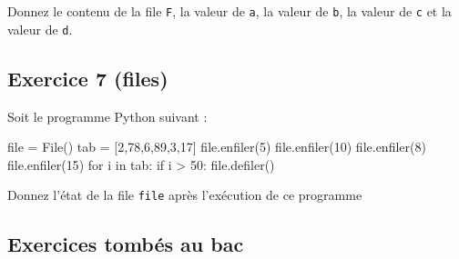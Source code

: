 \documentclass[
  a4paper,
  DIV=11,
  numbers=noendperiod]{scrartcl}
\newenvironment{Shaded}{\begin{snugshade}}{\end{snugshade}}
\newcommand{\BuiltInTok}[1]{\textcolor[rgb]{0.00,0.23,0.31}{#1}}
\newcommand{\ControlFlowTok}[1]{\textcolor[rgb]{0.00,0.23,0.31}{#1}}
\newcommand{\DecValTok}[1]{\textcolor[rgb]{0.68,0.00,0.00}{#1}}
\newcommand{\KeywordTok}[1]{\textcolor[rgb]{0.00,0.23,0.31}{#1}}
\newcommand{\NormalTok}[1]{\textcolor[rgb]{0.00,0.23,0.31}{#1}}
\newcommand{\OperatorTok}[1]{\textcolor[rgb]{0.37,0.37,0.37}{#1}}
\begin{document}
Donnez le contenu de la file \texttt{F}, la valeur de \texttt{a}, la
valeur de \texttt{b}, la valeur de \texttt{c} et la valeur de
\texttt{d}.

\hypertarget{fa-solid-pencil-alt-exercice-7-files}{%
\subsection{\texorpdfstring{ Exercice 7
(files)}{ Exercice 7 (files)}}\label{fa-solid-pencil-alt-exercice-7-files}}

Soit le programme Python suivant :

\begin{Shaded}
\begin{Highlighting}[]
\BuiltInTok{file} \OperatorTok{=}\NormalTok{ File()}
\NormalTok{tab }\OperatorTok{=}\NormalTok{ [}\DecValTok{2}\NormalTok{,}\DecValTok{78}\NormalTok{,}\DecValTok{6}\NormalTok{,}\DecValTok{89}\NormalTok{,}\DecValTok{3}\NormalTok{,}\DecValTok{17}\NormalTok{]}
\BuiltInTok{file}\NormalTok{.enfiler(}\DecValTok{5}\NormalTok{)}
\BuiltInTok{file}\NormalTok{.enfiler(}\DecValTok{10}\NormalTok{)}
\BuiltInTok{file}\NormalTok{.enfiler(}\DecValTok{8}\NormalTok{)}
\BuiltInTok{file}\NormalTok{.enfiler(}\DecValTok{15}\NormalTok{)}
\ControlFlowTok{for}\NormalTok{ i }\KeywordTok{in}\NormalTok{ tab:}
    \ControlFlowTok{if}\NormalTok{ i }\OperatorTok{\textgreater{}} \DecValTok{50}\NormalTok{:}
        \BuiltInTok{file}\NormalTok{.defiler()}
\end{Highlighting}
\end{Shaded}

Donnez l'état de la file \texttt{file} après l'exécution de ce programme

\hypertarget{fa-solid-pencil-alt-exercices-tombuxe9s-au-bac}{%
\subsection{\texorpdfstring{ Exercices tombés au
bac}{ Exercices tombés au bac}}\label{fa-solid-pencil-alt-exercices-tombuxe9s-au-bac}}
\end{document}
